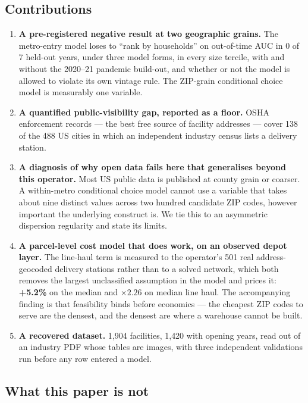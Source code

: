 \documentclass[conference]{IEEEtran}
\begin{document}
\subsection*{Contributions}

\begin{enumerate}
\item \textbf{A pre-registered negative result at two geographic grains.}
The metro-entry model loses to ``rank by households'' on out-of-time AUC in 0
of 7 held-out years, under three model forms, in every size tercile, with and
without the 2020--21 pandemic build-out, and whether or not the model is
allowed to violate its own vintage rule. The ZIP-grain conditional choice model
is measurably one variable.

\item \textbf{A quantified public-visibility gap, reported as a floor.}
OSHA enforcement records --- the best free source of facility addresses ---
cover 138 of the 488 US cities in which an independent industry census lists a
delivery station.

\item \textbf{A diagnosis of why open data fails here that generalises beyond
this operator.} Most US public data is published at county grain or coarser. A
within-metro conditional choice model cannot use a variable that takes about
nine distinct values across two hundred candidate ZIP codes, however important
the underlying construct is. We tie this to an asymmetric dispersion
regularity and state its limits.

\item \textbf{A parcel-level cost model that does work, on an observed depot
layer.} The line-haul term is measured to the operator's 501 real
address-geocoded delivery stations rather than to a solved network, which both
removes the largest unclassified assumption in the model and prices it:
\textbf{+5.2\%} on the median and \textbf{$\times 2.26$} on median line haul.
The accompanying finding is that feasibility binds before economics --- the
cheapest ZIP codes to serve are the densest, and the densest are where a
warehouse cannot be built.

\item \textbf{A recovered dataset.} 1{,}904 facilities, 1{,}420 with opening
years, read out of an industry PDF whose tables are images, with three
independent validations run before any row entered a model.
\end{enumerate}

\subsection*{What this paper is not}
\end{document}
